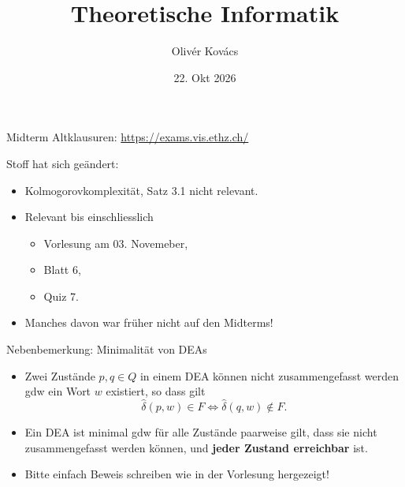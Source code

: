 \documentclass[11pt,aspectratio=169]{beamer}
\title{Theoretische Informatik}
\date[]{22. Okt 2026}
\author{Olivér Kovács}
\begin{document}

\titleframe



\begin{frame}{Midterm}
    Altklausuren: \href{https://exams.vis.ethz.ch/}{https://exams.vis.ethz.ch/}

    \vspace{1em}

    Stoff hat sich geändert:
    \begin{itemize}
    \item
        Kolmogorovkomplexität, Satz 3.1 nicht relevant.
    \item
        Relevant bis einschliesslich
        \begin{itemize}
            \item
                Vorlesung am 03. Novemeber,
            \item
                Blatt 6,
            \item
                Quiz 7.
        \end{itemize}
    \item Manches davon war früher nicht auf den Midterms!
    \end{itemize}
\end{frame}

\begin{frame}{Nebenbemerkung: Minimalität von DEAs}
    \begin{itemize}
    \item
        Zwei Zustände \(p, q \in Q\) in einem DEA können nicht
        zusammengefasst werden gdw ein Wort \(w\) existiert,
        so dass gilt
        \[
            \hat\delta(p, w) \in F \iff \hat\delta(q, w) \not\in F.
        \]
    \item
        Ein DEA ist minimal gdw für alle Zustände paarweise gilt,
        dass sie nicht zusammengefasst werden können, und
        \textbf{jeder Zustand erreichbar} ist.
        \vspace{1em}
    \item
        Bitte einfach Beweis schreiben wie in der Vorlesung
        hergezeigt!
    \end{itemize}
\end{frame}
\end{document}

